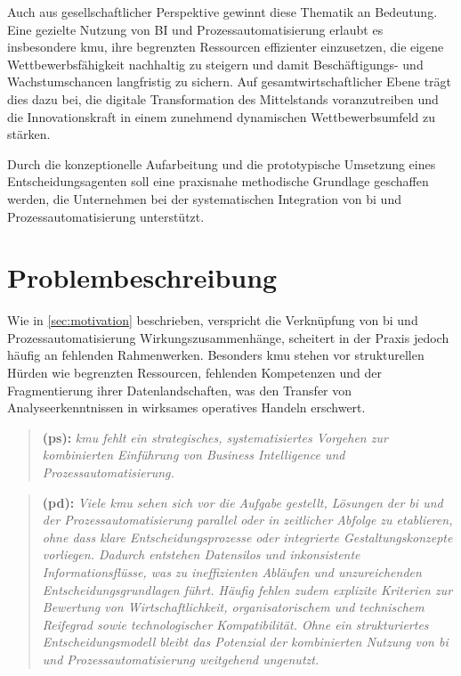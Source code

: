 Auch aus gesellschaftlicher Perspektive gewinnt diese Thematik an Bedeutung. \cite{Peter:2017} Eine gezielte Nutzung von BI und Prozessautomatisierung erlaubt es insbesondere \gls{kmu}, ihre begrenzten Ressourcen effizienter einzusetzen, die eigene Wettbewerbsfähigkeit nachhaltig zu steigern und damit Beschäftigungs- und Wachstumschancen langfristig zu sichern. \cite{Peter:2017} Auf gesamtwirtschaftlicher Ebene trägt dies dazu bei, die digitale Transformation des Mittelstands voranzutreiben und die Innovationskraft in einem zunehmend dynamischen Wettbewerbsumfeld zu stärken. \cite{BMWi:2020}

Durch die konzeptionelle Aufarbeitung und die prototypische Umsetzung eines Entscheidungsagenten soll eine praxisnahe methodische Grundlage geschaffen werden, die Unternehmen bei der systematischen Integration von \gls{bi} und Prozessautomatisierung unterstützt.


\section{Problembeschreibung}\label{sec:problembeschreibung}
Wie in \autoref{sec:motivation} beschrieben, verspricht die Verknüpfung von \gls{bi} und Prozessautomatisierung Wirkungszusammenhänge, scheitert in der Praxis jedoch häufig an fehlenden Rahmenwerken. Besonders \gls{kmu} stehen vor strukturellen Hürden wie begrenzten Ressourcen, fehlenden Kompetenzen und der Fragmentierung ihrer Datenlandschaften, was den Transfer von Analyseerkenntnissen in wirksames operatives Handeln erschwert. \cite{Frank:2020} 

\begin{quote}
\textbf{ (\gls{ps}):}
\emph{\gls{kmu} fehlt ein strategisches, systematisiertes Vorgehen zur kombinierten Einführung von Business Intelligence und Prozessautomatisierung.}
\end{quote}

\begin{quote}
\textbf{ (\gls{pd}):}
\emph{Viele \gls{kmu} sehen sich vor die Aufgabe gestellt, Lösungen der \gls{bi} und der Prozessautomatisierung parallel oder in zeitlicher Abfolge zu etablieren, ohne dass klare Entscheidungsprozesse oder integrierte Gestaltungskonzepte vorliegen. Dadurch entstehen Datensilos und inkonsistente Informationsflüsse, was zu ineffizienten Abläufen und unzureichenden Entscheidungsgrundlagen führt. Häufig fehlen zudem explizite Kriterien zur Bewertung von Wirtschaftlichkeit, organisatorischem und technischem Reifegrad sowie technologischer Kompatibilität. Ohne ein strukturiertes Entscheidungsmodell bleibt das Potenzial der kombinierten Nutzung von \gls{bi} und Prozessautomatisierung weitgehend ungenutzt.}
\end{quote}

